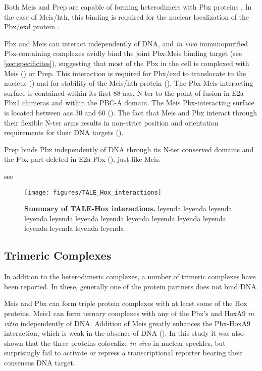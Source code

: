 Both Meis and Prep are capable of forming heterodimers with Pbx proteins \cite{ref}. In the case of Meis/\ac{hth}, this binding is required for the nuclear localization of the Pbx/\ac{exd} protein \cite{ref}.

Pbx and Meis can interact independently of DNA, and \textit{in vivo} immunopurified Pbx-containing complexes avidly bind the joint Pbx-Meis binding target (see \ref{sec:specificites}), suggesting that most of the Pbx in the cell is complexed with Meis (\cite{Chang1997}) or Prep. This interaction is required for Pbx/exd to translocate to the nucleus (\cite{Rieckhof1997}) and for stability of the Meis/hth protein (\cite{Abu-Shaar1998}). The Pbx Meis-interacting surface is contained within its first 88 \acp{aa}, \ac{N-ter} to the point of fusion in E2a-Pbx1 chimeras and within the PBC-A domain. The Meis Pbx-interacting surface is located between \acp{aa} 30 and 60 (\cite{Chang1997}). The fact that Meis and Pbx interact through their flexible \ac{N-ter} arms results in non-strict position and orientation requirements for their DNA targets (\cite{Jacobs1999}).

Prep binds Pbx independently of DNA through its \ac{N-ter} conserved domains and the Pbx part deleted in E2a-Pbx (\cite{Berthelsen1998}), just like Meis. 

see \cite{Mann1996}

\begin{figure}[]
  
  \centering
  \texttt{[image: figures/TALE\_Hox\_interactions]}
  \caption[Summary of TALE-Hox interactions]{\textbf{Summary of TALE-Hox interactions.} leyenda leyenda leyenda leyenda leyenda leyenda leyenda leyenda leyenda leyenda leyenda leyenda leyenda leyenda leyenda}
  \label{fig:TALE_Hox_interactions}
\end{figure}


\subsection{Trimeric Complexes}

In addition to the heterodimeric complexes, a number of trimeric complexes have been reported. In these, generally one of the protein partners does not bind DNA. 

Meis and Pbx can form triple protein complexes with at least some of the Hox proteins. Meis1 can form ternary complexes with any of the Pbx's and HoxA9 \textit{in vitro} independently of DNA. Addition of Meis greatly enhances the  Pbx-HoxA9 interaction, which is weak in the absence of DNA (\cite{Shen1999}).  In this study it was also shown that the three proteins colocalize \textit{in vivo} in nuclear speckles, but surprisingly fail to activate or repress a transcriptional reporter bearing their consensus DNA target.

